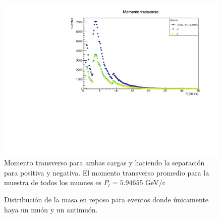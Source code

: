 \documentclass[11pt]{article}
\begin{document}
\begin{figure}[H]
\centering
\includegraphics[width=1\textwidth]{../Figuras/Prob3.pdf}
\caption{Momento transverso para ambas cargas y haciendo la separación para positiva y negativa. El momento transverso promedio para la muestra de todos los muones es $P_t = 5.94655$ GeV/c}
\label{fig:Prob3}
\end{figure}

\pagebreak


\begin{figure}[H]
\centering
{}

\caption{Distribución de la masa en reposo para eventos donde únicamente haya un muón y un antimuón.}
\label{fig:Prob4}
\end{figure}
\end{document}
